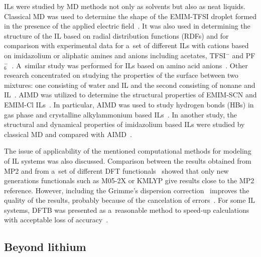 ILs were studied by MD methods not only as solvents but also as neat liquids. Classical MD was used to determine the shape of the EMIM-TFSI droplet formed in the presence of the applied electric field~\cite{il-md-2}. It was also used in determining the structure of the IL based on radial distribution functions (RDFs) and for comparison with experimental data for a~set of different ILs with cations based on imidazolium or aliphatic amines and anions including acetates, TFSI$^{-}$ and PF$_6^{-}$~\cite{il-md-10}. A~similar study was performed for ILs based on amino acid anions~\cite{il-md-11}. Other research concentrated on studying the properties of the surface between two mixtures: one consisting of water and IL and the second consisting of nonane and IL~\cite{il-md-12}. AIMD was utilized to determine the structural properties of EMIM-SCN and EMIM-Cl ILs~\cite{il-md-1}. In particular, AIMD was used to study hydrogen bonds (HBs) in gas phase and crystalline alkylammonium based ILs~\cite{il-md-7}. In another study, the structural and dynamical properties of imidazolium based ILs were studied by classical MD and compared with AIMD~\cite{il-md-9}.

The issue of applicability of the mentioned computational methods for modeling of IL systems was also discussed. Comparison between the results obtained from MP2 and from a~set of different DFT functionals~\cite{bench-ks-vs-mp2,bench-dft-vs-ai} showed that only new generations functionals such as M05-2X or KMLYP give results close to the MP2 reference. However, including the Grimme's dispersion correction~\cite{grimme-d3} improves the quality of the results, probably because of the cancelation of errors~\cite{bench-dft-grimme}. For some IL systems, DFTB was presented as a~reasonable method to speed-up calculations with acceptable loss of accuracy~\cite{bench-dftb}.

\subsection{Beyond lithium}

